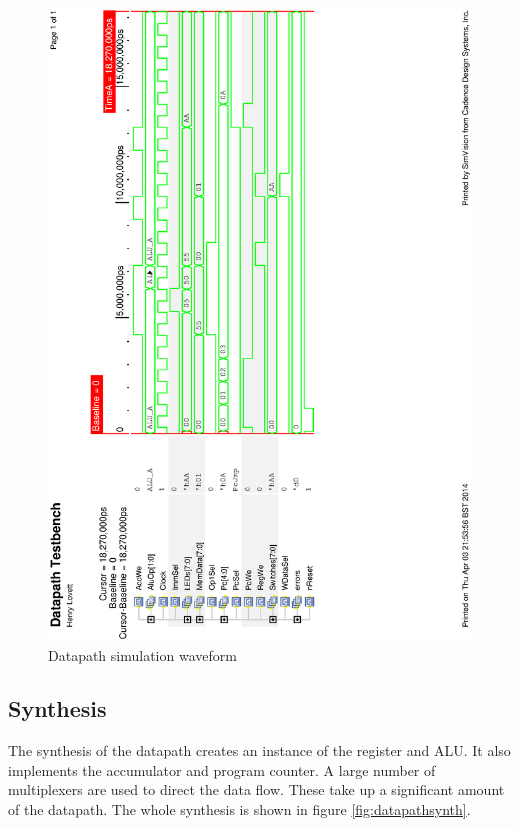 \begin{figure}
\includegraphics[height=\textheight-1cm]{Figures/datapathsim.eps}
\caption{Datapath simulation waveform}
\label{fig:datapathsim}
\end{figure}

\subsection{Synthesis}

The synthesis of the datapath creates an instance of the register and ALU. 
It also implements the accumulator and program counter. 
A large number of multiplexers are used to direct the data flow.%
These take up a significant amount of the datapath. 
The whole synthesis is shown in figure \ref{fig:datapathsynth}.


